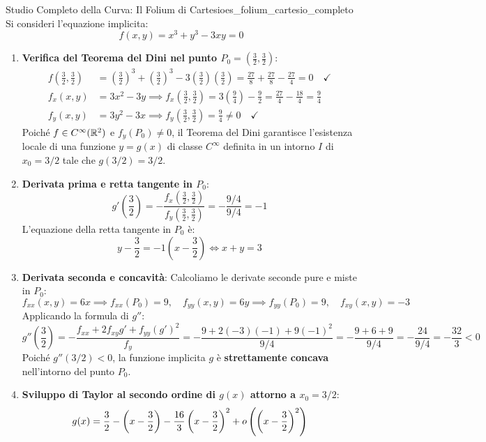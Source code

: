 \begin{esempio}{Studio Completo della Curva: Il Folium di Cartesio}{es_folium_cartesio_completo}
Si consideri l'equazione implicita:
\[
f(x, y) = x^3 + y^3 - 3xy = 0
\]
\begin{enumerate}
    \item \textbf{Verifica del Teorema del Dini nel punto $P_0 = \left(\frac{3}{2}, \frac{3}{2}\right)$}:
    \begin{align*}
        f\left(\frac{3}{2}, \frac{3}{2}\right) &= \left(\frac{3}{2}\right)^3 + \left(\frac{3}{2}\right)^3 - 3\left(\frac{3}{2}\right)\left(\frac{3}{2}\right) = \frac{27}{8} + \frac{27}{8} - \frac{27}{4} = 0 \quad \checkmark \\
        f_x(x, y) &= 3x^2 - 3y \implies f_x\left(\frac{3}{2}, \frac{3}{2}\right) = 3\left(\frac{9}{4}\right) - \frac{9}{2} = \frac{27}{4} - \frac{18}{4} = \frac{9}{4} \\
        f_y(x, y) &= 3y^2 - 3x \implies f_y\left(\frac{3}{2}, \frac{3}{2}\right) = \frac{9}{4} \neq 0 \quad \checkmark
    \end{align*}
    Poiché $f \in C^\infty(\mathbb{R}^2)$ e $f_y(P_0) \neq 0$, il Teorema del Dini garantisce l'esistenza locale di una funzione $y = g(x)$ di classe $C^\infty$ definita in un intorno $I$ di $x_0 = 3/2$ tale che $g(3/2) = 3/2$.
    
    \item \textbf{Derivata prima e retta tangente in $P_0$}:
    \[
    g'\left(\frac{3}{2}\right) = -\frac{f_x\left(\frac{3}{2}, \frac{3}{2}\right)}{f_y\left(\frac{3}{2}, \frac{3}{2}\right)} = -\frac{9/4}{9/4} = -1
    \]
    L'equazione della retta tangente in $P_0$ è:
    \[
    y - \frac{3}{2} = -1 \left( x - \frac{3}{2} \right) \iff x + y = 3
    \]
    
    \item \textbf{Derivata seconda e concavità}:
    Calcoliamo le derivate seconde pure e miste in $P_0$:
    \[
    f_{xx}(x,y) = 6x \implies f_{xx}(P_0) = 9, \quad f_{yy}(x,y) = 6y \implies f_{yy}(P_0) = 9, \quad f_{xy}(x,y) = -3
    \]
    Applicando la formula di $g''$:
    \[
    g''\left(\frac{3}{2}\right) = -\frac{f_{xx} + 2f_{xy}g' + f_{yy}(g')^2}{f_y} = -\frac{9 + 2(-3)(-1) + 9(-1)^2}{9/4} = -\frac{9 + 6 + 9}{9/4} = -\frac{24}{9/4} = -\frac{32}{3} < 0
    \]
    Poiché $g''(3/2) < 0$, la funzione implicita $g$ è \textbf{strettamente concava} nell'intorno del punto $P_0$.
    
    \item \textbf{Sviluppo di Taylor al secondo ordine di $g(x)$ attorno a $x_0 = 3/2$}:
    \[
    g(x) = \frac{3}{2} - \left(x - \frac{3}{2}\right) - \frac{16}{3}\left(x - \frac{3}{2}\right)^2 + o\left(\left(x - \frac{3}{2}\right)^2\right)
    \]
\end{enumerate}
\end{esempio}

